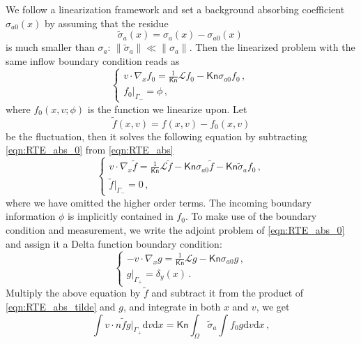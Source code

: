\documentclass[english,reqno]{amsart}
\theoremstyle{plain}
\theoremstyle{definition} %
\newcommand{\rd}{\mathrm{d}}
\newcommand{\Kn}{\mathsf{Kn}}
\begin{document}
We follow a linearization framework \cite{Ren_review} and set a background absorbing coefficient $\sigma_{a0}(x)$ by assuming that the residue 
\begin{equation*}
\tilde{\sigma}_a(x) = \sigma_a(x) - \sigma_{a0}(x)\,
\end{equation*}
is much smaller than $\sigma_a$: $\|\tilde{\sigma}_a\| \ll \|\sigma_a\|$. Then the linearized problem with the same inflow boundary condition reads as
\begin{equation} \label{eqn:RTE_abs_0}
\begin{cases}
v\cdot \nabla_x f_0=\frac{1}{\Kn}\mathcal{L}f_0-\Kn\sigma_{a0}f_0\,, \\
f_0|_{\Gamma_-}=\phi\,,
\end{cases}\,
\end{equation}
where $f_0(x,v; \phi)$ is the function we linearize upon. Let
\begin{equation*}
\tilde{f}(x,v) = f(x,v) - f_0(x,v)
\end{equation*}
be the fluctuation, then it solves the following equation by subtracting \eqref{eqn:RTE_abs_0} from \eqref{eqn:RTE_abs}
\begin{equation}\label{eqn:RTE_abs_tilde}
\begin{cases}
v\cdot \nabla_x \tilde{f}=\frac{1}{\Kn}\mathcal{L}\tilde{f}-\Kn\sigma_{a0}\tilde{f}-\Kn\tilde{\sigma}_af_0\,, \\
\tilde{f}|_{\Gamma_-}=0\,,
\end{cases}
\end{equation}
where we have omitted the higher order terms. The incoming boundary information $\phi$ is implicitly contained in $f_0$. To make use of the boundary condition and measurement, we write the adjoint problem of \eqref{eqn:RTE_abs_0} and assign it a Delta function boundary condition:  
\begin{equation}\label{eqn:RTE_abs_g}
\begin{cases}
-v\cdot \nabla_x g=\frac{1}{\Kn}\mathcal{L}g-\Kn\sigma_{a0}g\,, \\
g|_{\Gamma_+}=\delta_y(x)\,.
\end{cases}
\end{equation}
Multiply the above equation by $\tilde{f}$ and subtract it from the product of \eqref{eqn:RTE_abs_tilde} and $g$, and integrate in both $x$ and $v$, we get
\begin{equation} \label{eqn:RTE_abs_IBP}
 \int  v\cdot n \tilde{f} g |_{\Gamma_+}\rd{v} \rd{x}= \Kn \int_\Omega \tilde{\sigma}_a\int f_0g\rd{v}\rd{x}\,,
\end{equation}
\end{document}
